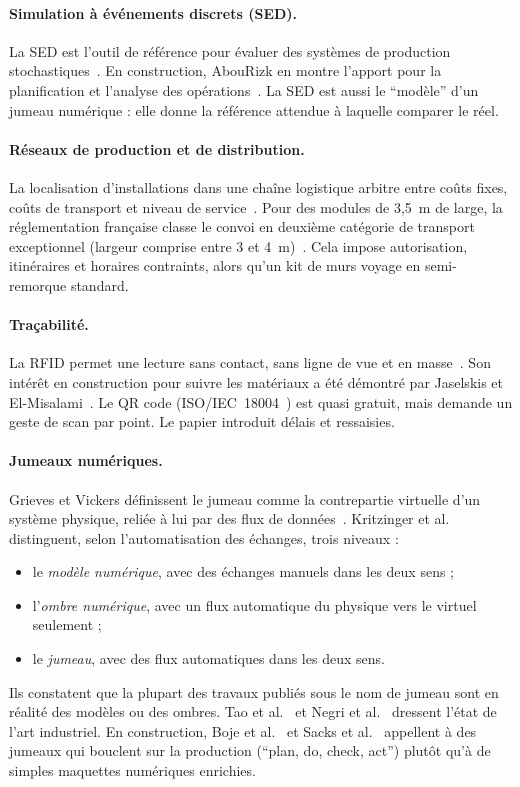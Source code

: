 \documentclass[11pt,a4paper]{article}
\begin{document}
\paragraph{Simulation à événements discrets (SED).} La SED est l'outil de référence pour évaluer
des systèmes de production stochastiques~\cite{banks2010,law2015}. En construction, AbouRizk en
montre l'apport pour la planification et l'analyse des opérations~\cite{abourizk2010}. La SED
est aussi le \enquote{modèle} d'un jumeau numérique : elle donne la référence attendue à
laquelle comparer le réel.

\paragraph{Réseaux de production et de distribution.} La localisation d'installations dans une
chaîne logistique arbitre entre coûts fixes, coûts de transport et niveau de
service~\cite{melo2009}. Pour des modules de 3,5~m de large, la réglementation française classe le
convoi en deuxième catégorie de transport exceptionnel (largeur comprise entre 3 et
4~m)~\cite{arrete2006}. Cela impose autorisation, itinéraires et horaires contraints, alors
qu'un kit de murs voyage en semi-remorque standard.

\paragraph{Traçabilité.} La RFID permet une lecture sans contact, sans ligne de vue et en
masse~\cite{want2006}. Son intérêt en construction pour suivre les matériaux a été démontré par
Jaselskis et El-Misalami~\cite{jaselskis2003}. Le QR code (ISO/IEC~18004~\cite{iso18004}) est
quasi gratuit, mais demande un geste de scan par point. Le papier introduit délais et ressaisies.

\paragraph{Jumeaux numériques.} Grieves et Vickers définissent le jumeau comme la contrepartie
virtuelle d'un système physique, reliée à lui par des flux de données~\cite{grieves2017}.
Kritzinger et al.~\cite{kritzinger2018} distinguent, selon l'automatisation des échanges, trois
niveaux :
\begin{itemize}
  \item le \emph{modèle numérique}, avec des échanges manuels dans les deux sens ;
  \item l'\emph{ombre numérique}, avec un flux automatique du physique vers le virtuel seulement ;
  \item le \emph{jumeau}, avec des flux automatiques dans les deux sens.
\end{itemize}
Ils constatent que la plupart des travaux publiés sous le nom de jumeau sont en réalité des
modèles ou des ombres. Tao et al.~\cite{tao2019} et Negri et al.~\cite{negri2017} dressent l'état
de l'art industriel. En construction, Boje et al.~\cite{boje2020} et Sacks et al.~\cite{sacks2020}
appellent à des jumeaux qui bouclent sur la production (\enquote{plan, do, check, act}) plutôt
qu'à de simples maquettes numériques enrichies.
\end{document}
